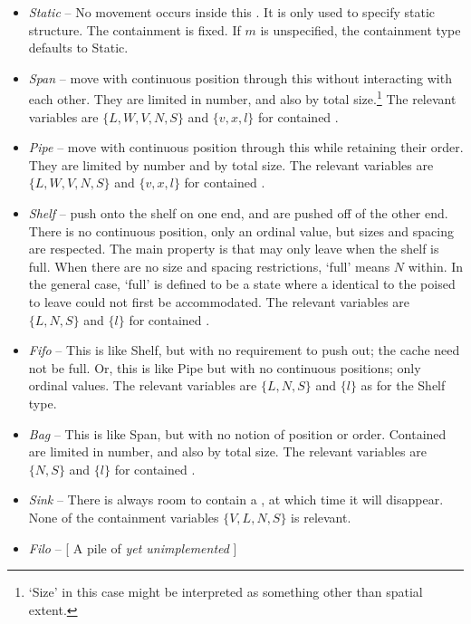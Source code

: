 \begin{itemize}

\item \emph{Static} -- No movement occurs inside this . It is only
  used to specify static structure. The containment is fixed. If $m$
  is unspecified, the containment type defaults to Static.

\item \emph{Span} --  move with continuous position through this
   without interacting with each other.  They are limited
  in number, and also by total size.\footnote{`Size' in this case might
    be interpreted as something other than spatial extent.}  The relevant
  variables are $\{L,W,V,N,S\}$ and $\{v,x,l\}$ for contained .
  
\item \emph{Pipe} --  move with continuous position through this
   while retaining their order.  They are limited by number
  and by total size.  The relevant variables are $\{L,W,V,N,S\}$ and
  $\{v,x,l\}$ for contained .

\item \emph{Shelf} --  push onto the shelf on one end, and are
  pushed off of the other end. There is no continuous position, only
  an ordinal value, but sizes and spacing are respected. The main
  property is that  may only leave when the shelf is
  full. When there are no size and spacing restrictions, `full' means
  $N$  within. In the general case, `full' is defined to
  be a state where a  identical to the  poised
  to leave could not first be accommodated. The relevant variables are
  $\{L,N,S\}$ and $\{l\}$ for contained .

\item \emph{Fifo} -- This is like Shelf, but with no requirement to push
   out; the cache need not be full.  Or, this is like
  Pipe but with no continuous positions; only ordinal values.  The
  relevant variables are $\{L,N,S\}$ and $\{l\}$ as for the Shelf
  type.

\item \emph{Bag} -- This is like Span, but with no notion of position or
  order. Contained  are limited in number, and also by
  total size.  The relevant variables are $\{N,S\}$ and $\{l\}$ for
  contained .
  
\item \emph{Sink} -- There is always room to contain a , at which
  time it will disappear.  None of the containment variables
  $\{V,L,N,S\}$ is relevant.

\item \emph{Filo} -- [ A pile of  \emph{yet unimplemented} ]

\end{itemize}

